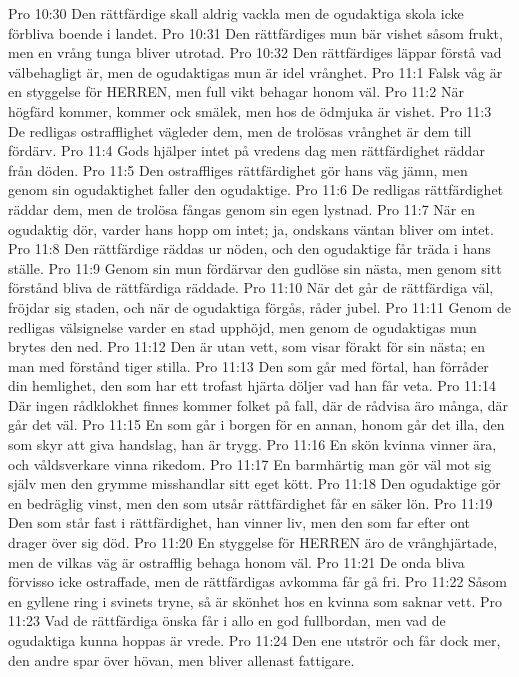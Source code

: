 Pro 10:30  Den rättfärdige skall aldrig vackla men de ogudaktiga skola icke förbliva boende i landet.
Pro 10:31  Den rättfärdiges mun bär vishet såsom frukt, men en vrång tunga bliver utrotad.
Pro 10:32  Den rättfärdiges läppar förstå vad välbehagligt är, men de ogudaktigas mun är idel vrånghet.
Pro 11:1  Falsk våg är en styggelse för HERREN, men full vikt behagar honom väl.
Pro 11:2  När högfärd kommer, kommer ock smälek, men hos de ödmjuka är vishet.
Pro 11:3  De redligas ostrafflighet vägleder dem, men de trolösas vrånghet är dem till fördärv.
Pro 11:4  Gods hjälper intet på vredens dag men rättfärdighet räddar från döden.
Pro 11:5  Den ostraffliges rättfärdighet gör hans väg jämn, men genom sin ogudaktighet faller den ogudaktige.
Pro 11:6  De redligas rättfärdighet räddar dem, men de trolösa fångas genom sin egen lystnad.
Pro 11:7  När en ogudaktig dör, varder hans hopp om intet; ja, ondskans väntan bliver om intet.
Pro 11:8  Den rättfärdige räddas ur nöden, och den ogudaktige får träda i hans ställe.
Pro 11:9  Genom sin mun fördärvar den gudlöse sin nästa, men genom sitt förstånd bliva de rättfärdiga räddade.
Pro 11:10  När det går de rättfärdiga väl, fröjdar sig staden, och när de ogudaktiga förgås, råder jubel.
Pro 11:11  Genom de redligas välsignelse varder en stad upphöjd, men genom de ogudaktigas mun brytes den ned.
Pro 11:12  Den är utan vett, som visar förakt för sin nästa; en man med förstånd tiger stilla.
Pro 11:13  Den som går med förtal, han förråder din hemlighet, den som har ett trofast hjärta döljer vad han får veta.
Pro 11:14  Där ingen rådklokhet finnes kommer folket på fall, där de rådvisa äro många, där går det väl.
Pro 11:15  En som går i borgen för en annan, honom går det illa, den som skyr att giva handslag, han är trygg.
Pro 11:16  En skön kvinna vinner ära, och våldsverkare vinna rikedom.
Pro 11:17  En barmhärtig man gör väl mot sig själv men den grymme misshandlar sitt eget kött.
Pro 11:18  Den ogudaktige gör en bedräglig vinst, men den som utsår rättfärdighet får en säker lön.
Pro 11:19  Den som står fast i rättfärdighet, han vinner liv, men den som far efter ont drager över sig död.
Pro 11:20  En styggelse för HERREN äro de vrånghjärtade, men de vilkas väg är ostrafflig behaga honom väl.
Pro 11:21  De onda bliva förvisso icke ostraffade, men de rättfärdigas avkomma får gå fri.
Pro 11:22  Såsom en gyllene ring i svinets tryne, så är skönhet hos en kvinna som saknar vett.
Pro 11:23  Vad de rättfärdiga önska får i allo en god fullbordan, men vad de ogudaktiga kunna hoppas är vrede.
Pro 11:24  Den ene utströr och får dock mer, den andre spar över hövan, men bliver allenast fattigare.
